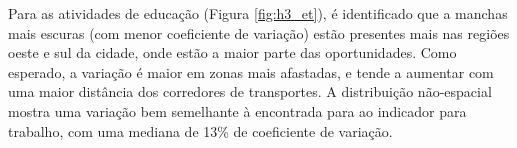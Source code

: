 \documentclass[        
    a4paper,          %
    12pt,             %
    chapter=TITLE,    %
    section=Title,    %
    subsection=Title, %
    oneside,          %
    english,          %
    spanish,          %
    brazil,           %
    fleqn             %
]{abntex2}
\begin{document}
  \begin{figure}[!h]
  \captionsetup{width=16cm}
  \centering
  \end{figure}
  
  Para as atividades de educação (Figura \ref{fig:h3_et}), é identificado que a manchas mais escuras (com menor coeficiente de variação) estão presentes mais nas regiões oeste e sul da cidade, onde estão a maior parte das oportunidades. Como esperado, a variação é maior em zonas mais afastadas, e tende a aumentar com uma maior distância dos corredores de transportes. A distribuição não-espacial mostra uma variação bem semelhante à encontrada para ao indicador para trabalho, com uma mediana de 13\% de coeficiente de variação.
  
  \begin{figure}[!h]
  \captionsetup{width=16cm}
  \centering
  \end{figure}
  
\end{document}
